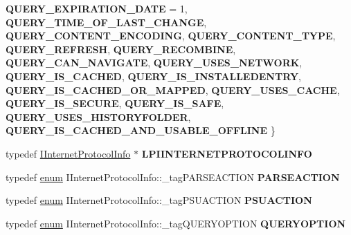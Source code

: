 \begin{DoxyCompactItemize}
{\bfseries Q\+U\+E\+R\+Y\+\_\+\+E\+X\+P\+I\+R\+A\+T\+I\+O\+N\+\_\+\+D\+A\+TE} = 1, 
{\bfseries Q\+U\+E\+R\+Y\+\_\+\+T\+I\+M\+E\+\_\+\+O\+F\+\_\+\+L\+A\+S\+T\+\_\+\+C\+H\+A\+N\+GE}, 
{\bfseries Q\+U\+E\+R\+Y\+\_\+\+C\+O\+N\+T\+E\+N\+T\+\_\+\+E\+N\+C\+O\+D\+I\+NG}, 
{\bfseries Q\+U\+E\+R\+Y\+\_\+\+C\+O\+N\+T\+E\+N\+T\+\_\+\+T\+Y\+PE}, 
\newline
{\bfseries Q\+U\+E\+R\+Y\+\_\+\+R\+E\+F\+R\+E\+SH}, 
{\bfseries Q\+U\+E\+R\+Y\+\_\+\+R\+E\+C\+O\+M\+B\+I\+NE}, 
{\bfseries Q\+U\+E\+R\+Y\+\_\+\+C\+A\+N\+\_\+\+N\+A\+V\+I\+G\+A\+TE}, 
{\bfseries Q\+U\+E\+R\+Y\+\_\+\+U\+S\+E\+S\+\_\+\+N\+E\+T\+W\+O\+RK}, 
\newline
{\bfseries Q\+U\+E\+R\+Y\+\_\+\+I\+S\+\_\+\+C\+A\+C\+H\+ED}, 
{\bfseries Q\+U\+E\+R\+Y\+\_\+\+I\+S\+\_\+\+I\+N\+S\+T\+A\+L\+L\+E\+D\+E\+N\+T\+RY}, 
{\bfseries Q\+U\+E\+R\+Y\+\_\+\+I\+S\+\_\+\+C\+A\+C\+H\+E\+D\+\_\+\+O\+R\+\_\+\+M\+A\+P\+P\+ED}, 
{\bfseries Q\+U\+E\+R\+Y\+\_\+\+U\+S\+E\+S\+\_\+\+C\+A\+C\+HE}, 
\newline
{\bfseries Q\+U\+E\+R\+Y\+\_\+\+I\+S\+\_\+\+S\+E\+C\+U\+RE}, 
{\bfseries Q\+U\+E\+R\+Y\+\_\+\+I\+S\+\_\+\+S\+A\+FE}, 
{\bfseries Q\+U\+E\+R\+Y\+\_\+\+U\+S\+E\+S\+\_\+\+H\+I\+S\+T\+O\+R\+Y\+F\+O\+L\+D\+ER}, 
{\bfseries Q\+U\+E\+R\+Y\+\_\+\+I\+S\+\_\+\+C\+A\+C\+H\+E\+D\+\_\+\+A\+N\+D\+\_\+\+U\+S\+A\+B\+L\+E\+\_\+\+O\+F\+F\+L\+I\+NE}
 \}
\item 
\mbox{\label{interface_i_internet_protocol_info_ab5d3c8ffcfe0f259bc6dea314acf64d1}} 
typedef \hyperlink{interface_i_internet_protocol_info}{I\+Internet\+Protocol\+Info} $\ast$ {\bfseries L\+P\+I\+I\+N\+T\+E\+R\+N\+E\+T\+P\+R\+O\+T\+O\+C\+O\+L\+I\+N\+FO}
\item 
\mbox{\label{interface_i_internet_protocol_info_a07eedcb45899391b277e32b461aeb2fb}} 
typedef \hyperlink{interfaceenum}{enum} I\+Internet\+Protocol\+Info\+::\+\_\+tag\+P\+A\+R\+S\+E\+A\+C\+T\+I\+ON {\bfseries P\+A\+R\+S\+E\+A\+C\+T\+I\+ON}
\item 
\mbox{\label{interface_i_internet_protocol_info_a520bcdf8abcc96bbb9106ff5e2db3b61}} 
typedef \hyperlink{interfaceenum}{enum} I\+Internet\+Protocol\+Info\+::\+\_\+tag\+P\+S\+U\+A\+C\+T\+I\+ON {\bfseries P\+S\+U\+A\+C\+T\+I\+ON}
\item 
\mbox{\label{interface_i_internet_protocol_info_a2eedbf9ad5106113dff53ab0896775c4}} 
typedef \hyperlink{interfaceenum}{enum} I\+Internet\+Protocol\+Info\+::\+\_\+tag\+Q\+U\+E\+R\+Y\+O\+P\+T\+I\+ON {\bfseries Q\+U\+E\+R\+Y\+O\+P\+T\+I\+ON}
\end{DoxyCompactItemize}

